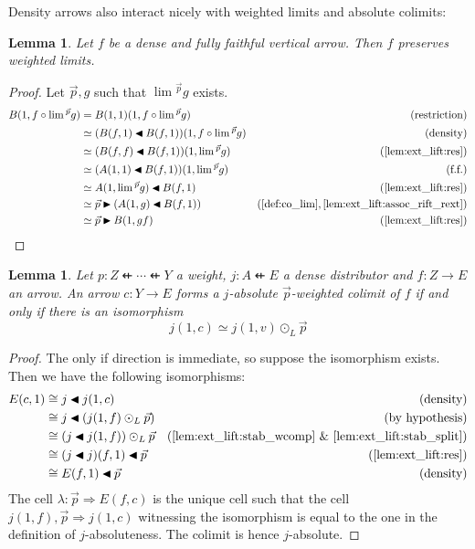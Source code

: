 \documentclass[10pt,a4paper]{article}
\newcommand{\To}{\Rightarrow}
\newcommand{\dfrom}{\nvleftarrow}
\newcommand{\rext}{\mathbin{\blacktriangleright}}
\newcommand{\rift}{\mathbin{\blacktriangleleft}}
\newcommand{\simeqq}{\cong}
\theoremstyle{plain}
\newtheorem{lemma}[theorem]{Lemma}
\theoremstyle{definition}
\theoremstyle{remark}
\begin{document}
Density arrows also interact nicely with weighted limits and absolute colimits:

\begin{lemma}
    \label{lem:ff_dense_prelim}
    Let $f$ be a dense and fully faithful vertical arrow. Then $f$ preserves weighted limits.
\end{lemma}

\begin{proof}
    Let $\vec{p}, g$ such that $\lim{}^{\vec{p}}g$ exists.
    \begin{align*}
        B(1, f\circ \lim{}^{\vec{p}}g) &= B(1, 1)(1, f\circ\lim{}^{\vec{p}}g) & (\text{restriction})\\
                                     &\simeq (B(f, 1)\rift B(f, 1))(1, f\circ\lim{}^{\vec{p}}g) & (\text{density})\\
                                     &\simeq (B(f, f)\rift B(f, 1))(1, \lim{}^{\vec{p}}g) & (\ref{lem:ext_lift:res})\\
                                     &\simeq (A(1, 1)\rift B(f, 1))(1, \lim{}^{\vec{p}}g) & (\text{f.f.})\\
                                     &\simeq A(1, \lim{}^{\vec{p}}g)\rift B(f, 1) & (\ref{lem:ext_lift:res})\\
                                     &\simeq \vec{p}\rext (A(1, g)\rift B(f, 1)) & (\ref{def:co_lim}, \ref{lem:ext_lift:assoc_rift_rext})\\
                                     &\simeq \vec{p}\rext B(1, gf) & (\ref{lem:ext_lift:res})
    \end{align*}
\end{proof}

\begin{lemma}
    \label{lem:dense_abs_iff_iso}
    Let $p : Z \dfrom \cdots \dfrom Y$ a weight, $j : A \dfrom E$ a dense distributor and $f : Z \to E$ an arrow. An arrow $c : Y \to E$ forms a $j$-absolute $\vec p$-weighted colimit of $f$ if and only if there is an isomorphism
    $$j(1, c) \simeq j(1, v) \odot_L \vec p$$
\end{lemma}

\begin{proof}
    The only if direction is immediate, so suppose the isomorphism exists. Then we have the following isomorphisms:
    \begin{align*}
        E(c, 1) &\simeqq j \rift j(1, c) & (\text{density})\\
                &\simeqq j \rift (j(1, f)\odot_L\vec p) & (\text{by hypothesis})\\
                &\simeqq (j \rift j(1, f))\odot_L \vec p & (\ref{lem:ext_lift:stab_wcomp}\ \&\ \ref{lem:ext_lift:stab_split})\\
                &\simeqq (j \rift j)(f, 1)\rift \vec p & (\ref{lem:ext_lift:res})\\
                &\simeqq E(f, 1)\rift \vec p & (\text{density})
    \end{align*}
    The cell $\lambda : \vec p \To E(f, c)$ is the unique cell such that the cell $j(1, f), \vec p \To j(1, c)$ witnessing the isomorphism is equal to the one in the definition of $j$-absoluteness. The colimit is hence $j$-absolute.
\end{proof}
\end{document}
